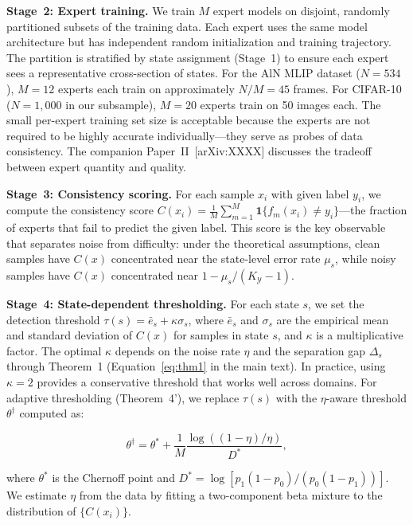 \textbf{Stage~2: Expert training.} We train $M$ expert models on disjoint, randomly partitioned subsets of the training data. Each expert uses the same model architecture but has independent random initialization and training trajectory. The partition is stratified by state assignment (Stage~1) to ensure each expert sees a representative cross-section of states. For the AlN MLIP dataset ($N = 534$), $M = 12$ experts each train on approximately $N/M = 45$ frames. For CIFAR-10 ($N = 1,000$ in our subsample), $M = 20$ experts train on 50 images each. The small per-expert training set size is acceptable because the experts are not required to be highly accurate individually---they serve as probes of data consistency. The companion Paper~II~[arXiv:XXXX] discusses the tradeoff between expert quantity and quality.

\textbf{Stage~3: Consistency scoring.} For each sample $x_i$ with given label $y_i$, we compute the consistency score $C(x_i) = \frac{1}{M} \sum_{m=1}^M \mathbf{1}\{f_m(x_i) \neq y_i\}$---the fraction of experts that fail to predict the given label. This score is the key observable that separates noise from difficulty: under the theoretical assumptions, clean samples have $C(x)$ concentrated near the state-level error rate $\mu_s$, while noisy samples have $C(x)$ concentrated near $1 - \mu_s/(K_{\mathcal{Y}} - 1)$.

\textbf{Stage~4: State-dependent thresholding.} For each state $s$, we set the detection threshold $\tau(s) = \bar{e}_s + \kappa\sigma_s$, where $\bar{e}_s$ and $\sigma_s$ are the empirical mean and standard deviation of $C(x)$ for samples in state $s$, and $\kappa$ is a multiplicative factor. The optimal $\kappa$ depends on the noise rate $\eta$ and the separation gap $\Delta_s$ through Theorem~1 (Equation~\eqref{eq:thm1} in the main text). In practice, using $\kappa = 2$ provides a conservative threshold that works well across domains. For adaptive thresholding (Theorem~4'), we replace $\tau(s)$ with the $\eta$-aware threshold $\theta^\dagger$ computed as:

\begin{equation}
\theta^\dagger = \theta^* + \frac{1}{M}\frac{\log((1-\eta)/\eta)}{D^*},
\label{eq:adaptive_threshold}
\end{equation}

where $\theta^*$ is the Chernoff point and $D^* = \log[p_1(1-p_0)/(p_0(1-p_1))]$. We estimate $\eta$ from the data by fitting a two-component beta mixture to the distribution of $\{C(x_i)\}$.

